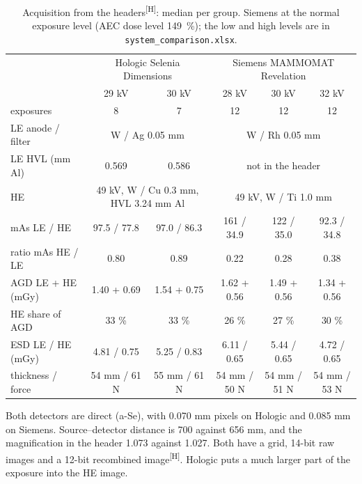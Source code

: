 \documentclass[11pt,a4paper]{article}
\newcommand{\Hd}{\textsuperscript{[H]}}
\newcommand{\code}[1]{\texttt{#1}}
\begin{document}
\begin{table}[H]\centering\small
\caption{Acquisition from the headers\Hd: median per group. Siemens at the normal exposure level (AEC dose level
149~\%); the low and high levels are in \code{system\_comparison.xlsx}.}\label{tab:acq}
\footnotesize\setlength{\tabcolsep}{3pt}
\begin{tabular}{lccccc}
\toprule
 & \multicolumn{2}{c}{Hologic Selenia Dimensions} & \multicolumn{3}{c}{Siemens MAMMOMAT Revelation} \\
 & 29 kV & 30 kV & 28 kV & 30 kV & 32 kV \\
\midrule
exposures & 8 & 7 & 12 & 12 & 12 \\
LE anode / filter & \multicolumn{2}{c}{W / Ag 0.05 mm} & \multicolumn{3}{c}{W / Rh 0.05 mm} \\
LE HVL (mm Al) & 0.569 & 0.586 & \multicolumn{3}{c}{not in the header} \\
HE & \multicolumn{2}{c}{49 kV, W / Cu 0.3 mm, HVL 3.24 mm Al} & \multicolumn{3}{c}{49 kV, W / Ti 1.0 mm} \\
mAs LE / HE & 97.5 / 77.8 & 97.0 / 86.3 & 161 / 34.9 & 122 / 35.0 & 92.3 / 34.8 \\
ratio mAs HE / LE & 0.80 & 0.89 & 0.22 & 0.28 & 0.38 \\
AGD LE + HE (mGy) & 1.40 + 0.69 & 1.54 + 0.75 & 1.62 + 0.56 & 1.49 + 0.56 & 1.34 + 0.56 \\
HE share of AGD & 33 \% & 33 \% & 26 \% & 27 \% & 30 \% \\
ESD LE / HE (mGy) & 4.81 / 0.75 & 5.25 / 0.83 & 6.11 / 0.65 & 5.44 / 0.65 & 4.72 / 0.65 \\
thickness / force & 54 mm / 61 N & 55 mm / 61 N & 54 mm / 50 N & 54 mm / 51 N & 54 mm / 53 N \\
\bottomrule
\end{tabular}
\end{table}

Both detectors are direct (a-Se), with 0.070 mm pixels on Hologic and 0.085 mm on Siemens. Source--detector distance
is 700 against 656 mm, and the magnification in the header 1.073 against 1.027. Both have a grid, 14-bit raw images
and a 12-bit recombined image\Hd. Hologic puts a much larger part of the exposure into the HE image.
\end{document}
